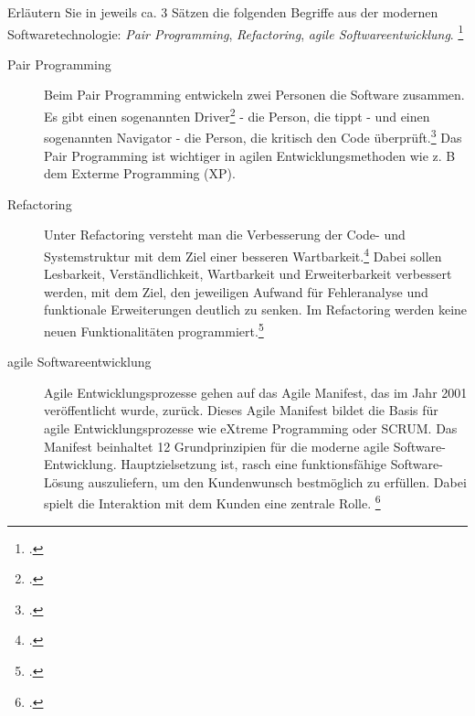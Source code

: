 \documentclass{bschlangaul-aufgabe}
\begin{document}

Erläutern Sie in jeweils ca. 3 Sätzen die folgenden Begriffe aus der
modernen Softwaretechnologie: \emph{Pair Programming},
\emph{Refactoring}, \emph{agile Softwareentwicklung}.
\footcite{examen:46116:2013:03}

\begin{bAntwort}
\begin{description}
\item[Pair Programming]
Beim Pair Programming entwickeln zwei Personen die Software zusammen. Es
gibt einen sogenannten Driver\footcite[Seite 22]{sosy:fs:agile-methoden}
- die Person, die tippt - und einen sogenannten Navigator - die Person,
die kritisch den Code überprüft.\footcite[Seite 49]{kleuker} Das Pair
Programming ist wichtiger in agilen Entwicklungsmethoden wie z. B dem
Exterme Programming (XP).

\item[Refactoring] Unter Refactoring versteht man die Verbesserung der
Code- und Systemstruktur mit dem Ziel einer besseren
Wartbarkeit.\footcite{sosy:ab:9} Dabei sollen Lesbarkeit,
Verständlichkeit, Wartbarkeit und Erweiterbarkeit verbessert werden, mit
dem Ziel, den jeweiligen Aufwand für Fehleranalyse und funktionale
Erweiterungen deutlich zu senken. Im Refactoring werden keine neuen
Funktionalitäten programmiert.\footcite{wiki:refactoring}

\item[agile Softwareentwicklung]
Agile Entwicklungsprozesse gehen auf das Agile Manifest, das im Jahr
2001 veröffentlicht wurde, zurück. Dieses Agile Manifest bildet die
Basis für agile Entwicklungsprozesse wie eXtreme Programming oder SCRUM.
Das Manifest beinhaltet 12 Grundprinzipien für die moderne agile
Software-Entwicklung. Hauptzielsetzung ist, rasch eine funktionsfähige
Software-Lösung auszuliefern, um den Kundenwunsch bestmöglich zu
erfüllen. Dabei spielt die Interaktion mit dem Kunden eine zentrale
Rolle.
\footcite[Seite 62]{schatten}
\end{description}
\end{bAntwort}
\end{document}
